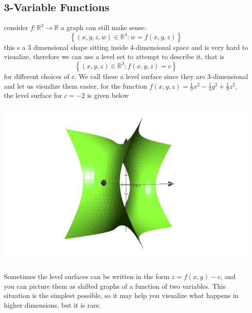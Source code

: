 \documentclass[11pt]{book}
\begin{document}

\subsection{3-Variable Functions}%
\label{sub:3_variable_functions}

consider $f : \mathbb{R} ^{3}  \to \mathbb{R} $ a graph can still make sense: 
\[
    \left\{ \left( x,y,z,w \right) \in \mathbb{R} ^{4} : w= f\left(x,y,z\right)  \right\} 
\]
this s a 3 dimensional shape sitting inside 4-dimensional space and is very hard to visualize, therefore we can use a level set to attempt to describe it, that is 
\[
    \left\{ \left( x,y,z \right) \in  \mathbb{R}^{3} : f\left( x,y,z \right) = c \right\} 
\]
for different choices of $c$. We call these a level surface since they are 3-dimensional and let us visuzlize them easier, for the function $f\left(x,y,z\right) = \frac{1}{9}x^2  - \frac{1}{4}y^2  + \frac{1}{9}z^2 $,  the level surface for $c= -2$ is given below

\begin{center}
    \includegraphics[width=\textwidth]{assets/-2-surf.jpg} 
\end{center}

Sometimes the level surfaces can be written in the form $z=f(x,y)-c$, and you can picture them as shifted graphs of a function of two variables. This situation is the simplest possible, so it may help you visualize what happens in higher dimensions, but it is rare.


\end{document}
